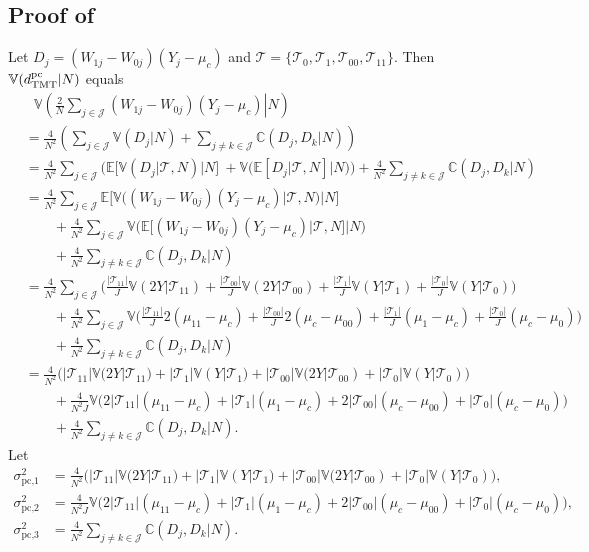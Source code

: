 \documentclass[12pt]{extarticle}
\newcommand{\E}{\mathbb{E}}
\newcommand{\nind}{J}
\newcommand{\tmt}{{\normalfont \text{TMT}}}
\newcommand{\dtmtpc}{d_{\tmt}^{\normalfont \text{pc}}}
\newcommand{\vir}{\sigma^2_{\text{pc,1}}}
\newcommand{\virb}{\sigma^2_{\text{pc,2}}}
\newcommand{\virc}{\sigma^2_{\text{pc,3}}}
\newcommand{\V}{\mathbb{V}}
\newcommand{\cV}{\mathbb{C}}
\newcommand{\cJ}{\mathcal{J}}
\newcommand{\cT}{\mathcal{T}}
\begin{document}
{{\subsection{Proof of } \label{app:vir_all}

Let $D_j=(W_{1j}-W_{0j})(Y_j-\mu_c)$ and $\cT = \big\{\cT_0,\cT_1,\cT_{00},\cT_{11}\big\}$. Then $\V(\dtmtpc|N)$ equals 
{\allowdisplaybreaks \begin{align*}
&~~~ \V\left( \left. \frac{2}{N}\sum_{j\in \cJ}(W_{1j}-W_{0j})(Y_j-\mu_c)\right| N \right) \nonumber \\
&= \frac{4}{N^2}\left( \sum_{j\in \cJ}\V(D_j|N) + \sum_{j\neq k\in \cJ}\cV(D_j,D_k|N) \right) \nonumber \\
&= \frac{4}{N^2}\sum_{j\in \cJ}\Big(\E\big[\V(D_j|\cT,N)\big|N\big]\ + \V\big(\E[D_j|\cT,N]\big|N\big)\Big) + \frac{4}{N^2}\sum_{j\neq k\in \cJ}\cV(D_j,D_k|N) \nonumber \\
&= \frac{4}{N^2}\sum_{j\in \cJ}\E\Big[\V\big((W_{1j}-W_{0j})(Y_j-\mu_c) \big|\cT,N\big)\Big|N\Big] \nonumber \\
& \qquad + \frac{4}{N^2}\sum_{j\in \cJ}  \V\Big(\E\big[(W_{1j}-W_{0j})(Y_j-\mu_c)\big|\cT,N\big]\Big|N\Big) \nonumber \\
& \qquad + \frac{4}{N^2} \sum_{j\neq k\in \cJ}\cV(D_j,D_k|N) \nonumber \\
&= \frac{4}{N^2}\sum_{j\in \cJ} \Big(\frac{|\cT_{11}|}{\nind}\V(2Y|\cT_{11})+\frac{|\cT_{00}|}{\nind}\V(2Y|\cT_{00})+\frac{|\cT_1|}{\nind}\V(Y|\cT_{1})+\frac{|\cT_0|}{\nind}\V(Y|\cT_{0})\Big)  ~ \nonumber  \\
& \qquad + \frac{4}{N^2}\sum_{j\in \cJ} \V\Big(\frac{|\cT_{11}|}{\nind}2(\mu_{11}-\mu_c) + \frac{|\cT_{00}|}{\nind}2(\mu_c-\mu_{00}) + \frac{|\cT_1|}{\nind}(\mu_1-\mu_c)+\frac{|\cT_0|}{\nind}(\mu_c-\mu_0)\Big) \nonumber \\
& \qquad + \frac{4}{N^2} \sum_{j\neq k\in \cJ}\cV(D_j,D_k|N) \nonumber \\
&= \frac{4}{N^2}\Big(|\cT_{11}|\V(2Y|\cT_{11}) + |\cT_{1}|\V(Y|\cT_1) + |\cT_{00}|\V(2Y|\cT_{00}) + |\cT_{0}|\V(Y|\cT_0)\Big) ~ \nonumber \\
& \qquad + \frac{4}{N^2\nind}\V\Big(2|\cT_{11}|(\mu_{11}-\mu_c) + |\cT_{1}|(\mu_1-\mu_c) + 2|\cT_{00}|(\mu_{c}-\mu_{00}) + |\cT_{0}|(\mu_c-\mu_0) \Big) ~ \nonumber \\
& \qquad + \frac{4}{N^2} \sum_{j\neq k\in \cJ}\cV(D_j,D_k|N).\nonumber                    
\end{align*}}Let 
{\allowdisplaybreaks \begin{align*}
\vir &= \frac{4}{N^2}\Big(|\cT_{11}|\V(2Y|\cT_{11}) + |\cT_{1}|\V(Y|\cT_1) + |\cT_{00}|\V(2Y|\cT_{00}) + |\cT_{0}|\V(Y|\cT_0)\Big), \nonumber \\
\virb &= \frac{4}{N^2\nind}\V\Big(2|\cT_{11}|(\mu_{11}-\mu_c) + |\cT_{1}|(\mu_1-\mu_c) + 2|\cT_{00}|(\mu_{c}-\mu_{00}) + |\cT_{0}|(\mu_c-\mu_0) \Big), \nonumber \\
\virc &= \frac{4}{N^2} \sum_{j\neq k\in \cJ}\cV(D_j,D_k|N). \nonumber
\end{align*}}

}}
\end{document}
